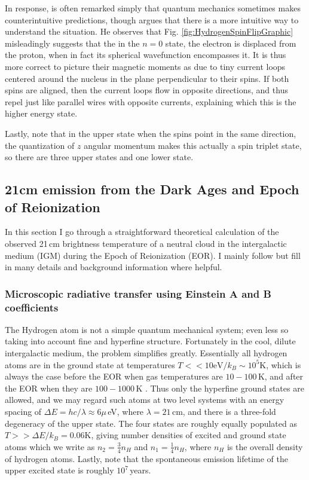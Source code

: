 In response, is often remarked simply that quantum mechanics sometimes makes counterintuitive predictions, though \citet{griffiths82} argues that there is a more intuitive way to understand the situation. He observes that Fig. \ref{fig:HydrogenSpinFlipGraphic} misleadingly suggests that the in the $n=0$ state, the electron is displaced from the proton, when in fact its spherical wavefunction encompasses it. It is thus more correct to picture their magnetic moments as due to tiny current loops centered around the nucleus in the plane perpendicular to their spins. If both spins are aligned, then the current loops flow in opposite directions, and thus repel just like parallel wires with opposite currents, explaining which this is the higher energy state.

Lastly, note that in the upper state when the spins point in the same direction, the quantization of $z$ angular momentum makes this actually a spin triplet state, so there are three upper states and one lower state.

\subsection{21cm emission from the Dark Ages and Epoch of Reionization}

In this section I go through a straightforward theoretical calculation of the observed 21\,cm brightness temperature of a neutral cloud in the intergalactic medium (IGM) during the Epoch of Reionization (EOR). I mainly follow \citet{PritchardLoebReview} but fill in many details and background information where helpful. 

\subsubsection{Microscopic radiative transfer using Einstein A and B coefficients}

The Hydrogen atom is not a simple quantum mechanical system; even less so taking into account fine and hyperfine structure. Fortunately in the cool, dilute intergalactic medium, the problem simplifies greatly. Essentially all hydrogen atoms are in the ground state at temperatures  $T<<10\text{eV}/k_B\sim10^5$K, which is always the case before the EOR when gas temperatures are $10-100$\,K, and after the EOR when they are $100-1000$\,K \citep{FurlanettoReview}. Thus only the hyperfine ground states are allowed, and we may regard such atoms at two level systems with an energy spacing of $\Delta E=hc/\lambda\approx6\mu$\,eV, where $\lambda=21$\,cm, and there is a three-fold degeneracy of the upper state. The four states are roughly equally populated as $T>>\Delta E/k_B =0.06$K, giving number densities of excited and ground state atoms which we write as $n_2=\frac{3}{4}n_H$ and $n_1=\frac{1}{4}n_H$, where $n_H$ is the overall density of hydrogen atoms. Lastly, note that the spontaneous emission lifetime of the upper excited state is roughly $10^7$\,years.


